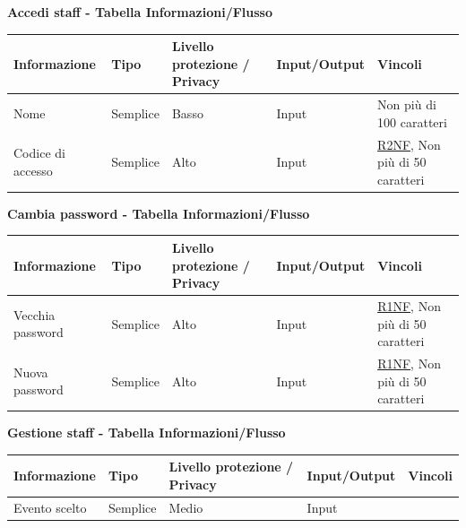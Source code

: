 \documentclass[a4paper]{article}
\begin{document}
\textbf{Accedi staff  - Tabella Informazioni/Flusso}

\begin{center}
    \begin{tabularx}{1\textwidth}{|X|X|X|X|X|}
        \hline
        \textbf{Informazione} &\textbf{Tipo} & \textbf{Livello protezione / Privacy} & \textbf{Input/Output} & \textbf{Vincoli}\\
        \hline
        \hline
        Nome & Semplice & Basso & Input & Non più di 100 caratteri\\
        \hline
        Codice di accesso & Semplice & Alto & Input & \hyperlink{R2NF}{R2NF}, Non più di 50 caratteri\\
        \hline
    \end{tabularx}
\end{center}

\textbf{Cambia password  - Tabella Informazioni/Flusso}

\begin{center}
    \begin{tabularx}{1\textwidth}{|X|X|X|X|X|}
        \hline
        \textbf{Informazione} &\textbf{Tipo} & \textbf{Livello protezione / Privacy} & \textbf{Input/Output} & \textbf{Vincoli}\\
        \hline
        \hline
        Vecchia password & Semplice & Alto & Input & \hyperlink{R1NF}{R1NF}, Non più di 50 caratteri\\
        \hline
        Nuova password & Semplice & Alto & Input & \hyperlink{R1NF}{R1NF}, Non più di 50 caratteri\\
        \hline
    \end{tabularx}
\end{center}

\textbf{Gestione staff  - Tabella Informazioni/Flusso}

\begin{center}
    \begin{tabularx}{1\textwidth}{|X|X|X|X|X|}
        \hline
        \textbf{Informazione} &\textbf{Tipo} & \textbf{Livello protezione / Privacy} & \textbf{Input/Output} & \textbf{Vincoli}\\
        \hline
        \hline
        Evento scelto & Semplice & Medio & Input & \\
        \hline
    \end{tabularx}
\end{center}
\end{document}
